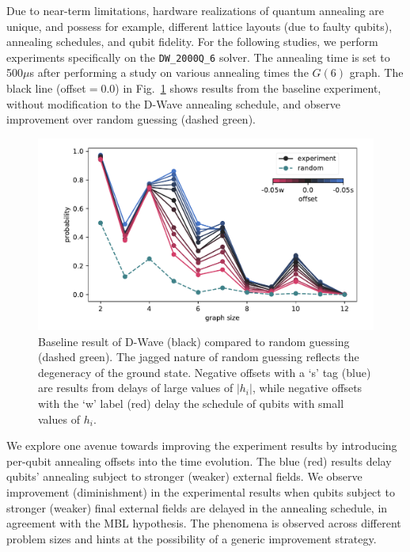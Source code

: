 \documentclass[prd,twocolumn,tightenlines,preprintnumbers,showpacs,superscriptaddress,notitlepage,nofootinbib,eqsecnum,floatfix,longbibliography,aps,10pt]{revtex4-1}
\begin{document}
Due to near-term limitations, hardware realizations of quantum annealing are unique, and possess for example, different lattice layouts (due to faulty qubits), annealing schedules, and qubit fidelity. For the following studies, we perform experiments specifically on the \texttt{DW\_2000Q\_6} solver. The annealing time is set to 500$\mu$s after performing a study on various annealing times the $G(6)$ graph. The black line (offset$=0.0$) in Fig.~\ref{fig:baseline} shows results from the baseline experiment, without modification to the D-Wave annealing schedule, and observe improvement over random guessing (dashed green).

\begin{figure}
	\centering
	\includegraphics[width=\columnwidth]{./DWave_scaling.pdf}
	\caption{Baseline result of D-Wave (black) compared to random guessing (dashed green). The jagged nature of random guessing reflects the degeneracy of the ground state. Negative offsets with a `s' tag (blue) are results from delays of large values of $|h_i|$, while negative offsets with the `w' label (red) delay the schedule of qubits with small values of $h_i$.}
	\label{fig:baseline}
\end{figure}

We explore one avenue towards improving the experiment results by introducing per-qubit annealing offsets into the time evolution.
The blue (red) results delay qubits' annealing subject to stronger (weaker) external fields. We observe improvement (diminishment) in the experimental results when qubits subject to stronger (weaker) final external fields are delayed in the annealing schedule, in agreement with the MBL hypothesis. The phenomena is observed across different problem sizes and hints at the possibility of a generic improvement strategy.


\end{document}
